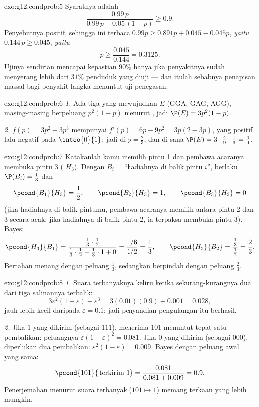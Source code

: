 \begin{solution}{exo:g12:condprob:5}
Syaratnya adalah
\[
\frac{0.99\,p}{0.99\,p + 0.05\,(1-p)} \geq 0.9 .
\]
Penyebutnya positif, sehingga ini terbaca
$0.99p \geq 0.891p + 0.045 - 0.045p$, \emph{yaitu} $0.144\,p \geq 0.045$,
\emph{yaitu}
\[
p \geq \frac{0.045}{0.144} = 0.3125 .
\]
Ujinya sendirian mencapai kepastian $90\%$ hanya jika penyakitnya sudah menyerang
lebih dari $31\%$ penduduk yang diuji --- dan itulah sebabnya penapisan massal
bagi penyakit langka menuntut uji penegasan.
\end{solution}

\begin{solution}{exo:g12:condprob:6}
\emph{1.} Ada tiga  yang mewujudkan $E$ (GGA, GAG, AGG), masing-masing berpeluang
$p^2(1-p)$ menurut , jadi $\P(E) = 3p^2(1 - p)$.

\emph{2.} $f(p) = 3p^2 - 3p^3$ mempunyai $f'(p) = 6p - 9p^2 = 3p(2 - 3p)$,
yang positif lalu negatif pada $\intoo{0}{1}$: jadi  di $p = \frac23$, dan di sana
$\P(E) = 3\cdot\frac49\cdot\frac13 = \frac49$.
\end{solution}

\begin{solution}{exo:g12:condprob:7}
Katakanlah kamu memilih pintu 1 dan pembawa acaranya membuka pintu 3 ( $H_3$). Dengan
$B_i$ = ``hadiahnya di balik pintu $i$'', berlaku $\P(B_i) = \frac13$ dan
\[
\pcond{B_1}{H_3} = \frac12, \qquad
\pcond{B_2}{H_3} = 1, \qquad
\pcond{B_3}{H_3} = 0
\]
(jika hadiahnya di balik pintumu, pembawa acaranya memilih antara pintu 2 dan 3
secara acak; jika hadiahnya di balik pintu 2, ia terpaksa membuka pintu 3). Bayes:
\[
\pcond{H_3}{B_1}
= \frac{\frac13\cdot\frac12}{\frac13\cdot\frac12 + \frac13\cdot1 + 0}
= \frac{1/6}{1/2} = \frac13,
\qquad
\pcond{H_3}{B_2} = \frac{\frac13}{\frac12} = \frac23 .
\]
Bertahan menang dengan peluang $\frac13$, sedangkan berpindah dengan peluang
$\frac23$.
\end{solution}

\begin{solution}{exo:g12:condprob:8}
\emph{1.} Suara terbanyaknya keliru ketika sekurang-kurangnya dua dari tiga salinannya
terbalik:
\[
3\varepsilon^2(1-\varepsilon) + \varepsilon^3
= 3(0.01)(0.9) + 0.001 = 0.028,
\]
jauh lebih kecil daripada $\varepsilon = 0.1$: jadi penyandian pengulangan itu berhasil.

\emph{2.} Jika $1$ yang dikirim (sebagai $111$), menerima $101$ menuntut tepat satu
pembalikan: peluangnya $\varepsilon(1-\varepsilon)^2 = 0.081$. Jika $0$ yang dikirim
(sebagai $000$), diperlukan dua pembalikan: $\varepsilon^2(1-\varepsilon) = 0.009$.
Bayes dengan peluang awal yang sama:
\[
\pcond{101}{\,\text{terkirim }1} = \frac{0.081}{0.081 + 0.009} = 0.9 .
\]
Penerjemahan menurut suara terbanyak ($101 \mapsto 1$) memang terkaan yang lebih mungkin.
\end{solution}

